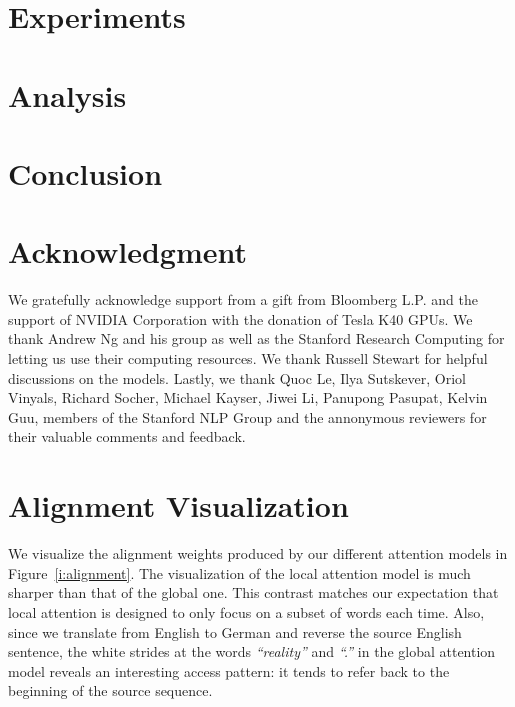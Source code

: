 \documentclass[11pt,a4paper]{article}
\begin{document}
\section{Experiments}
\label{sec:exp}



\section{Analysis}
\label{sec:analysis}


%

\section{Conclusion}
\label{sec:conclude}


\section*{Acknowledgment}
We gratefully acknowledge support from a gift from Bloomberg L.P.
and the support of NVIDIA Corporation with the donation of Tesla K40 GPUs.
We thank Andrew Ng and his group as well as the Stanford Research
Computing for letting us use their computing
resources.
We thank Russell Stewart for helpful discussions on the 
models. Lastly, we thank Quoc Le, Ilya Sutskever, Oriol Vinyals,
Richard Socher, Michael Kayser, Jiwei Li, Panupong Pasupat, Kelvin
Guu, members of the Stanford NLP Group and the annonymous reviewers for their valuable comments and feedback.



\appendix
\section{Alignment Visualization}
\label{sec:visual}
We visualize the alignment weights produced by our different attention
models in Figure~\ref{i:alignment}. The visualization of the local
attention model is much sharper than that of the global one. This contrast matches
our expectation that local attention is designed to only focus on a subset of
words each time. Also, since we
translate from English to German and reverse the source English sentence, the white strides
at the words {\it ``reality''} and {\it ``.''} in the global attention model reveals an
interesting access pattern: it tends to refer back to the beginning of the
source sequence. 
\end{document}
